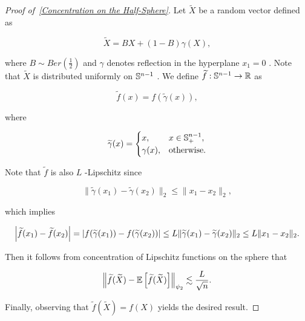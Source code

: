 \documentclass{article}
\begin{document}
\begin{proof}[Proof of~{\autoref{Concentration on the Half-Sphere}}]
\label{proof:Concentration on the Half-Sphere}
Let  $\widetilde{X}$  be a random vector defined as


\begin{equation*}
\widetilde{X} = BX + (1-B) \gamma(X),
\end{equation*}

where  $B \sim Ber\left( \frac{1}{2} \right)$  and  $\gamma$  denotes reflection in the hyperplane  $x_1 = 0$ . Note that  $\widetilde{X}$  is distributed uniformly on  $\mathbb{S}^{n-1}$ . We define  $\widetilde{f}: \mathbb{S}^{n-1} \to \mathbb{R}$  as


\begin{equation*}
\widetilde{f}(x) = f(\widetilde{\gamma}(x)),
\end{equation*}

where


\begin{equation*}
\widetilde{\gamma}(x) = \begin{cases}
x, & x \in \mathbb{S}^{n-1}_+, \\
\gamma(x),  & \text{otherwise}.
\end{cases}
\end{equation*}

Note that  $\widetilde{f}$   is also  $L$ -Lipschitz since


\begin{equation*}
\|\widetilde{\gamma}(x_1) - \widetilde{\gamma}(x_2)\|_2 \le \|x_1 - x_2\|_2,
\end{equation*}

which implies


\begin{equation*}
\left|\widetilde{f}(x_1) - \widetilde{f}(x_2)\right| = \left|f(\widetilde{\gamma}(x_1)) - f(\widetilde{\gamma}(x_2))\right|  \le L \|\widetilde{\gamma}(x_1) - \widetilde{\gamma}(x_2)\|_2 \le L\|x_1 - x_2\|_2.
\end{equation*}

Then it follows from concentration of Lipschitz functions on the sphere that


\begin{equation*}
\left\|\widetilde{f}(\widetilde{X}) - \mathbb{E}\left[\widetilde{f}(\widetilde{X})\right]\right\|_{\psi_2} \lesssim \frac{L}{\sqrt{n}}.
\end{equation*}

Finally, observing that  $\widetilde{f}(\widetilde{X})=f(X)$  yields the desired result.


\end{proof}
\end{document}
